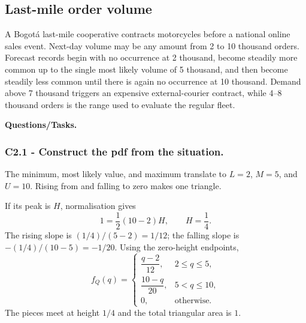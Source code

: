 \subsection{Last-mile order volume}\label{sec:c2-triangular-lastmile}
A Bogotá last-mile cooperative contracts motorcycles before a national online
sales event.  Next-day volume may be any amount from 2 to 10 thousand orders.
Forecast records begin with no occurrence at 2 thousand, become
steadily more common up to the single most likely volume of 5 thousand, and
then become steadily less common until there is again no occurrence
at 10 thousand.  Demand above 7 thousand triggers an expensive
external-courier contract, while 4--8 thousand orders is the range used to
evaluate the regular fleet.

\begingroup{}
\endgroup

\textbf{Questions/Tasks.}
\begin{enumerate}
\end{enumerate}

\subsubsection*{C2.1 - Construct the pdf from the situation.}
\label{subsec:c2-triangular-lastmile-a}
The minimum, most likely value, and maximum translate to $L=2$, $M=5$, and
$U=10$.  Rising from and falling to zero makes one triangle.

If its peak is
$H$, normalisation gives
\[
 1=\frac12(10-2)H,\qquad H=\frac14.
\]
The rising slope is $(1/4)/(5-2)=1/12$; the falling slope is
$-(1/4)/(10-5)=-1/20$.  Using the zero-height endpoints,
\[
 f_Q(q)=\begin{cases}
 \dfrac{q-2}{12},&2\le q\le5,\\[2mm]
 \dfrac{10-q}{20},&5<q\le10,\\[2mm]
 0,&\text{otherwise.}
 \end{cases}
\]
The pieces meet at height $1/4$ and the total triangular area is $1$.

